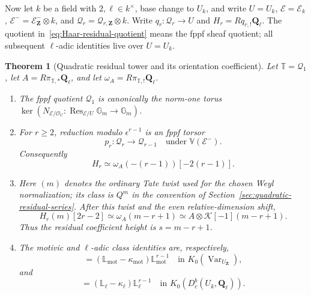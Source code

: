 \documentclass[11pt]{article}
\newtheorem{theorem}{Theorem}[section]
\theoremstyle{definition}
\theoremstyle{remark}
\newcommand{\Qell}{\mathbf Q_\ell}
\newcommand{\Lmot}{\mathbb L_{\mathrm{mot}}}
\newcommand{\Lell}{\mathbb L_{\ell}}
\newcommand{\UZ}{U_{\mathbf Z}}
\newcommand{\Uk}{U_k}
\newcommand{\kappamot}{\kappa_{\mathrm{mot}}}
\newcommand{\kappaell}{\kappa_{\ell}}
\newcommand{\cK}{\mathcal K}
\begin{document}
Now let $k$ be a field with $2,\ell\in k^\times$, base change to $\Uk$, and
write $U=\Uk$, $\mathcal E=\mathcal E_k$,
$\mathcal E^-=\mathcal E_{\mathbf Z}^-\otimes k$, and
$\mathscr Q_r=\mathscr Q_{r,\mathbf Z}\otimes k$.  Write
$q_r:\mathscr Q_r\to U$ and $H_r=Rq_{r,!}\Qell$.
The quotient in~\eqref{eq:Haar-residual-quotient} means the fppf sheaf
quotient; all subsequent $\ell$-adic identities live over $U=\Uk$.

\begin{theorem}[Quadratic residual tower and its orientation coefficient]
\label{thm:finite-residual-filtration}
Let $\mathbb T=\mathscr Q_1$, let
$A=R\pi_{\mathbb T,*}\Qell$, and let
$\omega_A=R\pi_{\mathbb T,!}\Qell$.
\begin{enumerate}[label=\textup{(\roman*)}]
\item The fppf quotient $\mathscr Q_1$ is canonically the norm-one torus
  $\ker(N_{\mathcal E/\mathcal O_U}:\operatorname{Res}_{\mathcal E/U}
  \mathbb G_m\to\mathbb G_m)$.
\item For $r\ge2$, reduction modulo $\epsilon^{r-1}$ is an fppf torsor
  \begin{equation}
   p_r:\mathscr Q_r\longrightarrow\mathscr Q_{r-1}
   \quad\text{under }\mathbb V(\mathcal E^-).
   \label{eq:Haar-congruence-tower}
  \end{equation}
  Consequently
  \begin{equation}
   H_r\simeq\omega_A(-(r-1))[-2(r-1)].
   \label{eq:Haar-shell-Thom}
  \end{equation}
\item Here $(m)$ denotes the ordinary Tate twist used for the chosen Weyl
  normalization; its class is $Q^m$ in the convention of
  Section~\ref{sec:quadratic-residual-series}.  After this twist and the even
  relative-dimension shift,
  \begin{equation}
   H_r(m)[2r-2]
   \simeq\omega_A(m-r+1)
   \simeq A\otimes\cK[-1](m-r+1).
   \label{eq:Haar-canonical-height-object}
  \end{equation}
  Thus the residual coefficient height is $s=m-r+1$.
\item The motivic and $\ell$-adic class identities are, respectively,
  \begin{equation}
   [\mathscr Q_{r,\mathbf Z}]
   =(\Lmot-\kappamot)\Lmot^{r-1}
   \quad\text{in }K_0(\operatorname{Var}_{\UZ}),
   \label{eq:residual-layer-motivic-class}
  \end{equation}
  and
  \begin{equation}
   [Rq_{r,!}\Qell]
   =(\Lell-\kappaell)\Lell^{r-1}
   \quad\text{in }K_0(D_c^b(\Uk,\Qell)).
   \label{eq:residual-layer-class}
  \end{equation}
\end{enumerate}
\end{theorem}
\end{document}
